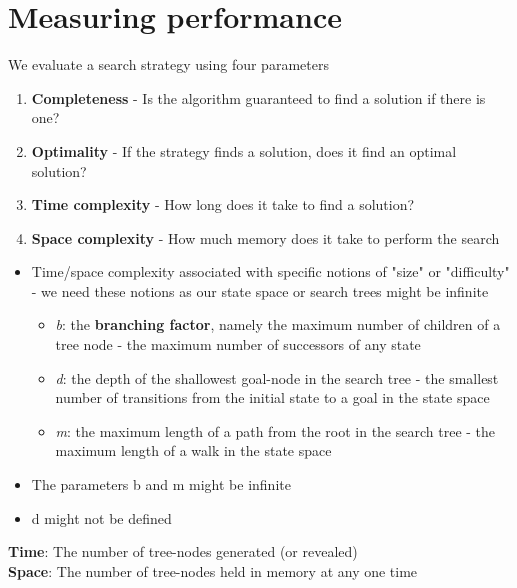 \documentclass{article}[18pt]
\begin{document}
\section{Measuring performance}
We evaluate a search strategy using four parameters
\begin{enumerate}
	\item \textbf{Completeness} - Is the algorithm guaranteed to find a solution if there is one?
	\item \textbf{Optimality} - If the strategy finds a solution, does it find an optimal solution?
	\item \textbf{Time complexity} - How long does it take to find a solution?
	\item \textbf{Space complexity} - How much memory does it take to perform the search
\end{enumerate}	
\begin{itemize}
	\item Time/space complexity associated with specific notions of "size" or "difficulty" - we need these notions as our state space or search trees might be infinite
	\begin{itemize}
		\item \textit{b}: the \textbf{branching factor}, namely the maximum number of children of a tree node - the maximum number of successors of any state
		\item \textit{d}: the depth of the shallowest goal-node in the search tree - the smallest number of transitions from the initial state to a goal in the state space
		\item \textit{m}: the maximum length of a path from the root in the search tree - the maximum length of a walk in the state space
	\end{itemize}
	\item The parameters b and m might be infinite
	\item d might not be defined
\end{itemize}
\textbf{Time}: The number of tree-nodes generated (or revealed)\\
\textbf{Space}: The number of tree-nodes held in memory at any one time
\end{document}

